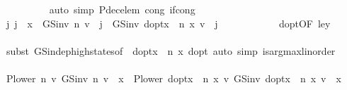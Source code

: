 \begin{isabellebody}
\ \ \ \ \ \ \ \ \isamarkupfalse%
\ {\isacharparenleft}{\kern0pt}auto\ simp{\isacharcolon}{\kern0pt}\ P{\isacharunderscore}{\kern0pt}dec{\isacharunderscore}{\kern0pt}elem\ cong{\isacharcolon}{\kern0pt}\ if{\isacharunderscore}{\kern0pt}cong{\isacharparenright}{\kern0pt}\isanewline
\ \ \ \ \ \ \isamarkupfalse%
\ \isanewline
\ \ \ \ \ \ \isacommand{{\isacharbraceleft}{\kern0pt}}\isamarkupfalse%
\isanewline
\ \ \ \ \ \ \ \ \isamarkupfalse%
\ {\isachardoublequoteopen}{\isasymAnd}j{\isachardot}{\kern0pt}\ j\ {\isacharless}{\kern0pt}\ x\ {\isasymLongrightarrow}\ GS{\isacharunderscore}{\kern0pt}inv\ n\ v\ {\isachardollar}{\kern0pt}\ j\ {\isasymle}\ GS{\isacharunderscore}{\kern0pt}inv\ {\isacharparenleft}{\kern0pt}d{\isacharunderscore}{\kern0pt}opt{\isacharparenleft}{\kern0pt}x\ {\isacharcolon}{\kern0pt}{\isacharequal}{\kern0pt}\ n\ x{\isacharparenright}{\kern0pt}{\isacharparenright}{\kern0pt}\ v\ {\isachardollar}{\kern0pt}\ j{\isachardoublequoteclose}\isanewline
\ \ \ \ \ \ \ \ \ \ \isamarkupfalse%
\ d{\isacharunderscore}{\kern0pt}opt{\isacharbrackleft}{\kern0pt}OF\ le{\isacharunderscore}{\kern0pt}y{\isacharbrackright}{\kern0pt}\ {}\isanewline
\ \ \ \ \ \ \ \ \ \ \isamarkupfalse%
\ {\isacharparenleft}{\kern0pt}subst\ GS{\isacharunderscore}{\kern0pt}indep{\isacharunderscore}{\kern0pt}high{\isacharunderscore}{\kern0pt}states{\isacharbrackleft}{\kern0pt}of\ {\isacharunderscore}{\kern0pt}\ {\isachardoublequoteopen}d{\isacharunderscore}{\kern0pt}opt{\isacharparenleft}{\kern0pt}x\ {\isacharcolon}{\kern0pt}{\isacharequal}{\kern0pt}\ n\ x{\isacharparenright}{\kern0pt}{\isachardoublequoteclose}\ d{\isacharunderscore}{\kern0pt}opt{\isacharbrackright}{\kern0pt}{\isacharparenright}{\kern0pt}\ {\isacharparenleft}{\kern0pt}auto\ simp{\isacharcolon}{\kern0pt}\ is{\isacharunderscore}{\kern0pt}arg{\isacharunderscore}{\kern0pt}max{\isacharunderscore}{\kern0pt}linorder{\isacharparenright}{\kern0pt}\isanewline
\ \ \ \ \ \ \ \ \isamarkupfalse%
\ {\isachardoublequoteopen}{\isacharparenleft}{\kern0pt}P{\isacharunderscore}{\kern0pt}lower\ n\ {\isacharasterisk}{\kern0pt}v\ GS{\isacharunderscore}{\kern0pt}inv\ n\ v{\isacharparenright}{\kern0pt}\ {\isachardollar}{\kern0pt}\ x\ {\isasymle}\ {\isacharparenleft}{\kern0pt}P{\isacharunderscore}{\kern0pt}lower\ {\isacharparenleft}{\kern0pt}d{\isacharunderscore}{\kern0pt}opt{\isacharparenleft}{\kern0pt}x\ {\isacharcolon}{\kern0pt}{\isacharequal}{\kern0pt}\ n\ x{\isacharparenright}{\kern0pt}{\isacharparenright}{\kern0pt}\ {\isacharasterisk}{\kern0pt}v\ GS{\isacharunderscore}{\kern0pt}inv\ {\isacharparenleft}{\kern0pt}d{\isacharunderscore}{\kern0pt}opt{\isacharparenleft}{\kern0pt}x\ {\isacharcolon}{\kern0pt}{\isacharequal}{\kern0pt}\ n\ x{\isacharparenright}{\kern0pt}{\isacharparenright}{\kern0pt}\ v{\isacharparenright}{\kern0pt}\ {\isachardollar}{\kern0pt}\ x{\isachardoublequoteclose}\isanewline

\end{isabellebody}
